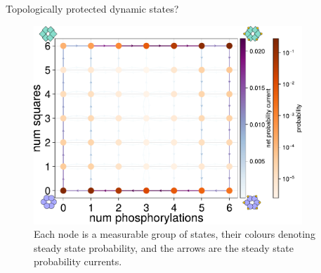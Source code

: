 \documentclass[10pt,mathserif]{beamer}
\begin{document}
\begin{frame}[fragile]{Topologically protected dynamic states?}
	\newrefsection
	\begin{figure}
		\centering
		\includegraphics[width=0.9\textwidth]{figures/ca_plot_plus_diagrams.pdf}
		\caption{
			Each node is a measurable group of states, their colours denoting steady state probability, and the arrows are the steady state probability currents.
		}
	\end{figure}
	\vfill
	\printbibliography[heading=none]
	\vspace{-\fill}
\end{frame}
\end{document}
